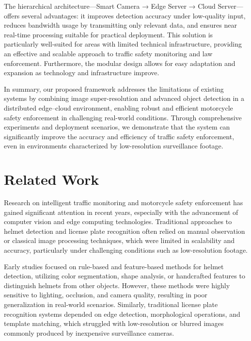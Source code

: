 \documentclass[conference]{IEEEtran}
\begin{document}
The hierarchical architecture—Smart Camera → Edge Server → Cloud Server—offers several advantages: it improves detection accuracy under low-quality input, reduces bandwidth usage by transmitting only relevant data, and ensures near real-time processing suitable for practical deployment. This solution is particularly well-suited for areas with limited technical infrastructure, providing an effective and scalable approach to traffic safety monitoring and law enforcement. Furthermore, the modular design allows for easy adaptation and expansion as technology and infrastructure improve.

In summary, our proposed framework addresses the limitations of existing systems by combining image super-resolution and advanced object detection in a distributed edge–cloud environment, enabling robust and efficient motorcycle safety enforcement in challenging real-world conditions. Through comprehensive experiments and deployment scenarios, we demonstrate that the system can significantly improve the accuracy and efficiency of traffic safety enforcement, even in environments characterized by low-resolution surveillance footage.

\section{Related Work}
\label{section2}

Research on intelligent traffic monitoring and motorcycle safety enforcement has gained significant attention in recent years, especially with the advancement of computer vision and edge computing technologies. Traditional approaches to helmet detection and license plate recognition often relied on manual observation or classical image processing techniques, which were limited in scalability and accuracy, particularly under challenging conditions such as low-resolution footage.

Early studies focused on rule-based and feature-based methods for helmet detection, utilizing color segmentation, shape analysis, or handcrafted features to distinguish helmets from other objects. However, these methods were highly sensitive to lighting, occlusion, and camera quality, resulting in poor generalization in real-world scenarios. Similarly, traditional license plate recognition systems depended on edge detection, morphological operations, and template matching, which struggled with low-resolution or blurred images commonly produced by inexpensive surveillance cameras.
\end{document}

